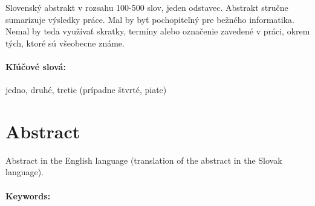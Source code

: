 \documentclass[12pt, twoside]{book}
\begin{document}
Slovenský abstrakt v rozsahu 100-500 slov, jeden odstavec. Abstrakt
stručne sumarizuje výsledky práce. Mal by byť pochopiteľný pre bežného
informatika. Nemal by teda využívať skratky, termíny alebo označenie
zavedené v práci, okrem tých, ktoré sú všeobecne známe.

\paragraph*{Kľúčové slová:} jedno, druhé, tretie (prípadne štvrté, piate)


\newpage 
\section*{Abstract}

Abstract in the English language (translation of the abstract in the
Slovak language).


\paragraph*{Keywords:} 


%
%



\newpage 

\tableofcontents



\newpage 

\listoffigures


\mainmatter
\end{document}
